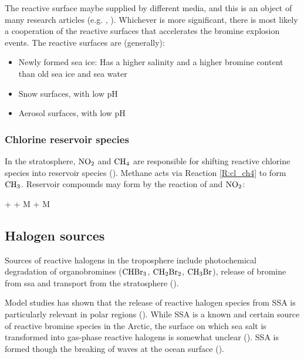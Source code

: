 \medskip

The reactive surface maybe supplied by different media, and this is an object of many research articles (e.g.  \cite{Simpson2018}, \cite{Rankin}). Whichever is more significant, there is most likely a cooperation of the reactive surfaces that accelerates the bromine explosion events. The reactive surfaces are (generally): 

\begin{itemize}
    \item Newly formed sea ice: Has a higher salinity and a higher bromine content than old sea ice and sea water \cite{Rankin}
    \item Snow surfaces, with low pH
    \item Aerosol surfaces, with low pH
\end{itemize}

\subsubsection{Chlorine reservoir species}

In the stratosphere, $\mathrm{NO_2}$ and $\mathrm{CH_4}$ are responsible for shifting reactive chlorine species into reservoir species (\cite{SeinfeldSpyros}). Methane acts via Reaction \ref{R:cl_ch4} to form $\mathrm{CH_3}$. Reservoir compounds may form by the reaction of  and $\mathrm{NO_2}$: 

\begin{reaction}
     +  + M \rightarrow {} + M
    \label{R:clono2}
\end{reaction}

\subsection{Halogen sources}\label{sec:halogen_sources}

Sources of reactive halogens in the troposphere include photochemical degradation of organobromines ($\mathrm{CHBr_3}$, $\mathrm{CH_2Br_2}$, $\mathrm{CH_3Br}$), release of bromine from \acrfull{ssa} and transport from the stratosphere (\cite{Schmidt}). 

\medskip

Model studies has shown that the release of reactive halogen species from SSA is particularly relevant in polar regions (\cite{Schmidt}). While SSA is a known and certain source of reactive bromine species in the Arctic, the surface on which sea salt is transformed into gas-phase reactive halogens is somewhat unclear (\cite{Simpson2005}). SSA is formed though the breaking of waves at the ocean surface (\cite{Simpson2015}). 


